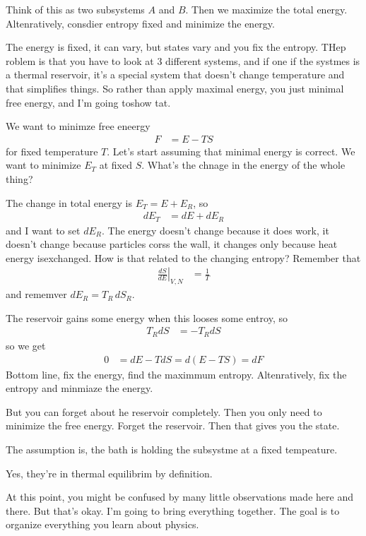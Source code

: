Think of this as two subsystems $A$ and $B$.
Then we maximize the total energy.
Altenratively,
consdier entropy fixed and minimize the energy.

The energy is fixed,
it can vary,
but states vary and you fix the entropy.
THep roblem is that you have to look at 3 different systems,
and if one if the systmes is a thermal reservoir,
it's a special system that doesn't change temperature and that simplifies
things.
So rather than apply maximal energy,
you just minimal free energy,
and I'm going toshow tat.

We want to minimze free eneergy
\begin{align}
    F &= E - TS
\end{align}
for fixed temperature $T$.
Let's start assuming that minimal energy is correct.
We want to minimize $E_T$ at fixed $S$.
What's the chnage in the energy of the whole thing?

The change in total energy is $E_T=E+E_R$,
so
\begin{align}
    dE_T &= dE + dE_R
\end{align}
and I want to set $dE_R$.
The energy doesn't change because it does work,
it doesn't change because particles corss the wall,
it changes only because heat energy isexchanged.
How is that related to the changing entropy?
Remember that
\begin{align}
    \left.\frac{dS}{dE}\right|_{V,N} &= \frac{1}{T}
\end{align}
and rememver $dE_R = T_R \,dS_R$.

The reservoir gains some energy when this looses some entroy,
so
\begin{align}
    T_R dS &= - T_R dS
\end{align}
so we get
\begin{align}
    0 &= dE - TdS = d(E - TS) = dF
\end{align}
Bottom line,
fix the energy,
find the maximmum entropy.
Altenratively,
fix the entropy
and minmiaze the energy.

But you can forget about he reservoir completely.
Then you only need to minimize the free energy.
Forget the reservoir.
Then that gives you the state.

\begin{question}
    The assumption is,
    the bath is holding the subsystme at a fixed tempeature.
\end{question}
Yes, they're in thermal equilibrim by definition.

At this point,
you might be confused by many little observations made here and there.
But that's okay.
I'm going to bring everything together.
The goal is to organize everything you learn about physics.

